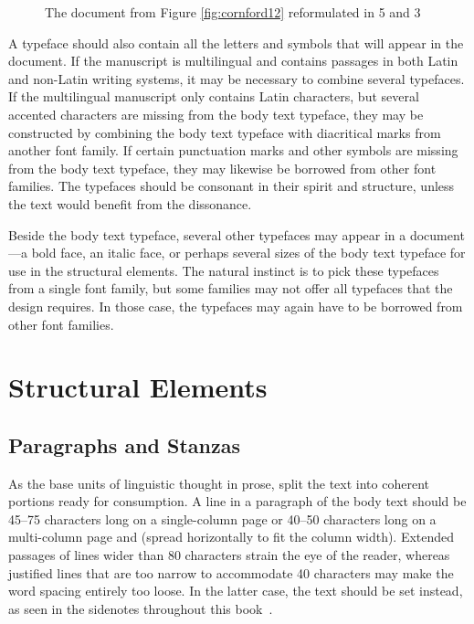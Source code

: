 \begin{figure}
  \caption{The document from Figure \ref{fig:cornford12} reformulated in
    5 and 3}
\end{figure}

A typeface should also contain all the letters and symbols that will appear in
the document. If the manuscript is multilingual and contains passages in both
Latin and non-Latin writing systems, it may be necessary to combine several
typefaces. If the multilingual manuscript only contains Latin characters, but
several accented characters are missing from the body text typeface, they may be
constructed by combining the body text typeface with diacritical marks from
another font family. If certain punctuation marks and other symbols are missing
from the body text typeface, they may likewise be borrowed from other font
families. The typefaces should be consonant in their spirit and structure,
unless the text would benefit from the
dissonance.~\cite[sec.\,5.1.2]{bringhurst92}

Beside the body text typeface, several other typefaces may appear in a
document---a bold face, an italic face, or perhaps several sizes of the body
text typeface for use in the structural elements. The natural instinct is to
pick these typefaces from a single font family, but some families may not offer
all typefaces that the design requires. In those case, the typefaces may again
have to be borrowed from other font families.

\section{Structural Elements}
\subsection{Paragraphs and Stanzas}\label{sec:paragraphs}
As the base units of linguistic thought in prose,  split the
text into coherent portions ready for consumption. A line in a paragraph of the
body text should be 45--75 characters long on a single-column page or 40--50
characters long on a multi-column page and
(spread horizontally to fit the column width). Extended passages of lines wider
than 80 characters strain the eye of the reader, whereas justified lines that
are too narrow to accommodate 40 characters may make the word spacing entirely
too loose. In the latter case, the text should be set
 instead, as
seen in the sidenotes throughout this book~\cite[sec.\,2.1.2]{bringhurst92}.

